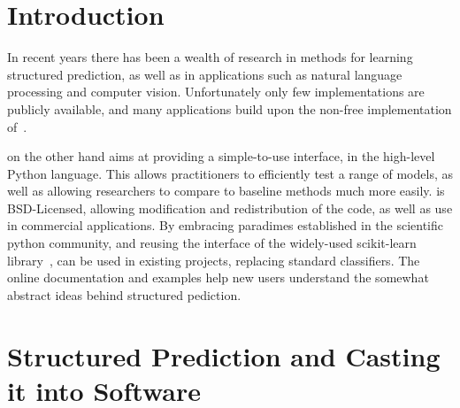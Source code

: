 





\section{Introduction}
In recent years there has been a wealth of research in methods for learning structured prediction,
as well as in applications such as natural language processing and computer vision.
Unfortunately only few implementations are publicly available, and many applications build upon
the non-free implementation of~\citet{joachims2009cutting}.

\pystruct on the other hand aims at providing a simple-to-use interface, in the high-level Python language.
This allows practitioners to efficiently test a range of models, as well as allowing researchers
to compare to baseline methods much more easily.
\pystruct is BSD-Licensed, allowing modification and redistribution of the code,
as well as use in commercial applications.  By embracing paradimes established
in the scientific python community, and reusing the interface of the
widely-used {\sc scikit-learn} library~\citep{pedregosa2011scikit}, \pystruct
can be used in existing projects, replacing standard classifiers.
The online documentation and examples help new
users understand the somewhat abstract ideas behind structured pediction.



\section{Structured Prediction and Casting it into Software}\label{sec:api}

